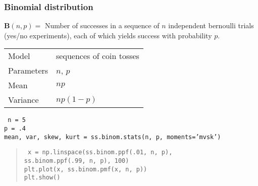 \documentclass[t]{beamer}
\begin{document}
\begin{frame}
  \frametitle{Binomial distribution}

  $\mathbf{B}(n,p) = $ Number of successes in a sequence of $n$ independent bernoulli
  trials (yes/no experiments), each of which yields success with
  probability $p$.
  \bigskip

  \begin{tabular}{l|l}
    Model & sequences of coin tosses\\[1mm]
    Parameters & $n$, $p$\\[1mm]
    Mean & $np$\\[1mm]
    Variance & $np(1-p)$
  \end{tabular}

  \vspace{6mm}
   {
    \tt
    n = 5\\
    p = .4\\
    mean, var, skew, kurt = ss.binom.stats(n, p, moments='mvsk')

  }
   {
    \begin{quote}
      \tt
      x = np.linspace(ss.binom.ppf(.01, n, p), \\
      \hspace{1cm} ss.binom.ppf(.99, n, p), 100) \\
      plt.plot(x, ss.binom.pmf(x, n, p)) \\
      plt.show()
    \end{quote}

    \note {  }
  }


  
  
\end{frame}
\end{document}
